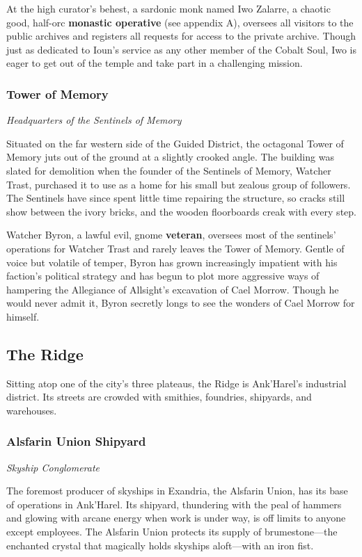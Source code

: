 \documentclass[10pt,a4paper,twoside,bg=print,twocolumn,openany,nodeprecatedcode]{dndbook}
\begin{document}
At the high curator's behest, a sardonic monk named Iwo Zalarre, a chaotic good, half-orc \textbf{monastic operative} (see appendix A), oversees all visitors to the public archives and registers all requests for access to the private archive. Though just as dedicated to Ioun's service as any other member of the Cobalt Soul, Iwo is eager to get out of the temple and take part in a challenging mission.

\subsubsection{Tower of Memory}
\textit{Headquarters of the Sentinels of Memory}

Situated on the far western side of the Guided District, the octagonal Tower of Memory juts out of the ground at a slightly crooked angle. The building was slated for demolition when the founder of the Sentinels of Memory, Watcher Trast, purchased it to use as a home for his small but zealous group of followers. The Sentinels have since spent little time repairing the structure, so cracks still show between the ivory bricks, and the wooden floorboards creak with every step.

Watcher Byron, a lawful evil, gnome \textbf{veteran}, oversees most of the sentinels' operations for Watcher Trast and rarely leaves the Tower of Memory. Gentle of voice but volatile of temper, Byron has grown increasingly impatient with his faction's political strategy and has begun to plot more aggressive ways of hampering the Allegiance of Allsight's excavation of Cael Morrow. Though he would never admit it, Byron secretly longs to see the wonders of Cael Morrow for himself.

\subsection{The Ridge}
Sitting atop one of the city's three plateaus, the Ridge is Ank'Harel's industrial district. Its streets are crowded with smithies, foundries, shipyards, and warehouses.

\subsubsection{Alsfarin Union Shipyard}
\textit{Skyship Conglomerate}

The foremost producer of skyships in Exandria, the Alsfarin Union, has its base of operations in Ank'Harel. Its shipyard, thundering with the peal of hammers and glowing with arcane energy when work is under way, is off limits to anyone except employees. The Alsfarin Union protects its supply of brumestone—the enchanted crystal that magically holds skyships aloft—with an iron fist.
\end{document}
